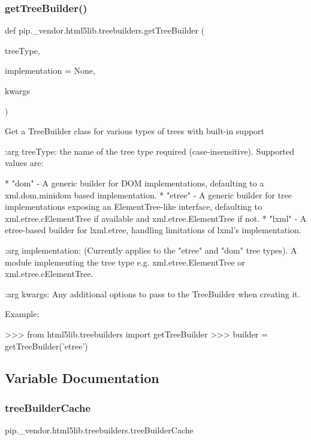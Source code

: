 \subsubsection{\texorpdfstring{get\+Tree\+Builder()}{getTreeBuilder()}}
{\footnotesize\ttfamily def pip.\+\_\+vendor.\+html5lib.\+treebuilders.\+get\+Tree\+Builder (\begin{DoxyParamCaption}\item[{}]{tree\+Type,  }\item[{}]{implementation = {\ttfamily None},  }\item[{}]{kwargs }\end{DoxyParamCaption})}

\begin{DoxyVerb}Get a TreeBuilder class for various types of trees with built-in support

:arg treeType: the name of the tree type required (case-insensitive). Supported
    values are:

    * "dom" - A generic builder for DOM implementations, defaulting to a
      xml.dom.minidom based implementation.
    * "etree" - A generic builder for tree implementations exposing an
      ElementTree-like interface, defaulting to xml.etree.cElementTree if
      available and xml.etree.ElementTree if not.
    * "lxml" - A etree-based builder for lxml.etree, handling limitations
      of lxml's implementation.

:arg implementation: (Currently applies to the "etree" and "dom" tree
    types). A module implementing the tree type e.g. xml.etree.ElementTree
    or xml.etree.cElementTree.

:arg kwargs: Any additional options to pass to the TreeBuilder when
    creating it.

Example:

>>> from html5lib.treebuilders import getTreeBuilder
>>> builder = getTreeBuilder('etree')\end{DoxyVerb}
 

\subsection{Variable Documentation}
\mbox{\label{namespacepip_1_1__vendor_1_1html5lib_1_1treebuilders_af20116ca2f6a2765396a54f21e84261e}} 
\subsubsection{\texorpdfstring{tree\+Builder\+Cache}{treeBuilderCache}}
{\footnotesize\ttfamily pip.\+\_\+vendor.\+html5lib.\+treebuilders.\+tree\+Builder\+Cache}

